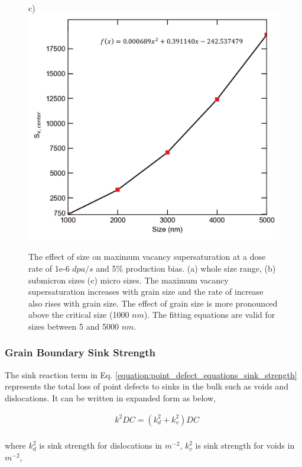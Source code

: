 \documentclass[utf8]{frontiersSCNS} %
\begin{document}
\begin{figure}[h!]
        c)\includegraphics[scale=0.55]{Fig8_c}
        \caption{The effect of size on maximum vacancy supersaturation at a dose rate of 1e-6 $dpa/s$ and 5\% production bias. (a) whole size range, (b) submicron sizes (c) micro sizes. The maximum vacancy supersaturation increases with grain size and the rate of increase also rises with grain size. The effect of grain size is more pronounced above the critical size (1000 $nm$). The fitting equations are valid for sizes between 5 and 5000 $nm$.\\}
        \label{figure:center_vacancy_supersaturation_neutron}
    \end{figure}

\subsubsection{Grain Boundary Sink Strength}
    The sink reaction term in Eq. \ref{equation:point_defect_equations_sink_strength} represents the total loss of point defects to sinks in the bulk such as voids and dislocations. It can be written in expanded form as below,

    \begin{equation}
      \begin{aligned}
        &k^2DC=(k_d^2 + k_v^2)DC
      \end{aligned}
    \end{equation}\\
    where ${k_d^2}$ is sink strength for dislocations in $m^{-2}$, $ {k_v^2}$ is sink strength for voids in ${m^{-2}}$,
    
\end{document}
